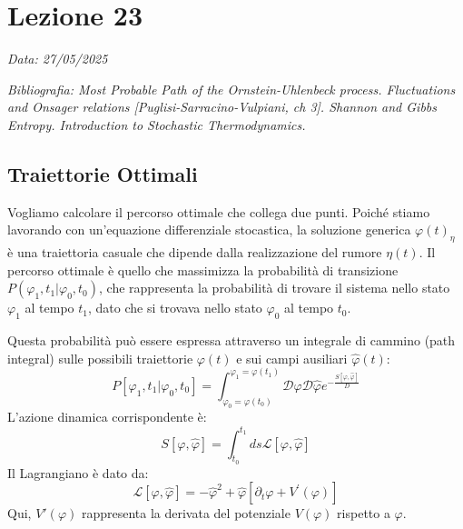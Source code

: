 \chapter{Lezione 23}
\label{chap:lezione_23} %

\begin{flushright}
\textit{Data: 27/05/2025}
\end{flushright}
\textit{Bibliografia: 
Most Probable Path of the Ornstein-Uhlenbeck process. Fluctuations and Onsager relations [Puglisi-Sarracino-Vulpiani, ch 3]. Shannon and Gibbs Entropy. Introduction to Stochastic Thermodynamics.}



\section{Traiettorie Ottimali}

Vogliamo calcolare il percorso ottimale che collega due punti.
Poiché stiamo lavorando con un'equazione differenziale stocastica, la soluzione generica $\varphi(t)_{\eta}$ è una traiettoria casuale che dipende dalla realizzazione del rumore $\eta(t)$.
Il percorso ottimale è quello che massimizza la probabilità di transizione $P(\varphi_{1},t_{1}|\varphi_{0},t_{0})$, che rappresenta la probabilità di trovare il sistema nello stato $\varphi_{1}$ al tempo $t_{1}$, dato che si trovava nello stato $\varphi_{0}$ al tempo $t_{0}$.

Questa probabilità può essere espressa attraverso un integrale di cammino (path integral) sulle possibili traiettorie $\varphi(t)$ e sui campi ausiliari $\hat{\varphi}(t)$:
\begin{equation}
P[\varphi_{1},t_{1}|\varphi_{0},t_{0}]=\int_{\varphi_{0}=\varphi(t_{0})}^{\varphi_{1}=\varphi(t_{1})}\mathcal{D}\varphi\mathcal{D}\hat{\varphi}e^{-\frac{S[\varphi,\hat{\varphi}]}{D}}
\end{equation}
L'azione dinamica corrispondente è:
\begin{equation}
S[\varphi,\hat{\varphi}]=\int_{t_{0}}^{t_{1}}ds\mathcal{L}[\varphi,\hat{\varphi}]
\end{equation}
Il Lagrangiano è dato da:
\begin{equation}
\mathcal{L}[\varphi,\hat{\varphi}]=-\hat{\varphi}^{2}+\hat{\varphi}[\partial_{t}\varphi+V^{\prime}(\varphi)]
\end{equation}
Qui, $V'(\varphi)$ rappresenta la derivata del potenziale $V(\varphi)$ rispetto a $\varphi$.

